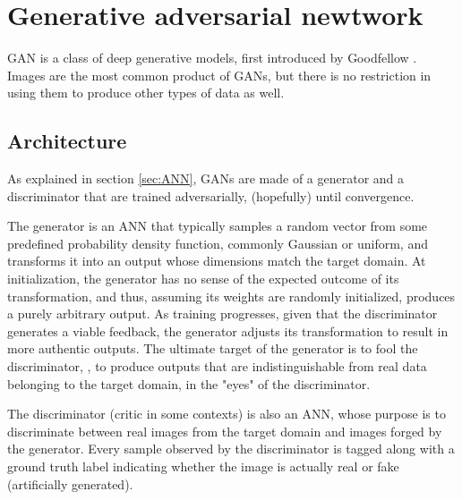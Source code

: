 \begin{enumerate}
\end{enumerate}


\section{Generative adversarial newtwork}
GAN is a class of deep generative models, first introduced by Goodfellow \etal \cite{goodfellow2014generative}.
Images are the most common product of GANs, but there is no restriction in using them to produce other types of data as well.

\subsection{Architecture}
As explained in section \ref{sec:ANN}, GANs are made of a generator and a discriminator that are trained adversarially, (hopefully) until convergence.

The generator is an ANN that typically samples a random vector from some predefined probability density function, commonly Gaussian or uniform, and transforms it into an output whose dimensions match the target domain.
At initialization, the generator has no sense of the expected outcome of its transformation, and thus, assuming its weights are randomly initialized, produces a purely arbitrary output.
As training progresses, given that the discriminator generates a viable feedback, the generator adjusts its transformation to result in more authentic outputs.
The ultimate target of the generator is to fool the discriminator, \ie, to produce outputs that are indistinguishable from real data belonging to the target domain, in the "eyes" of the discriminator.

The discriminator (\aka critic in some contexts) is also an ANN, whose purpose is to discriminate between real images from the target domain and images forged by the generator.
Every sample observed by the discriminator is tagged along with a ground truth label indicating whether the image is actually real or fake (artificially generated).
    
